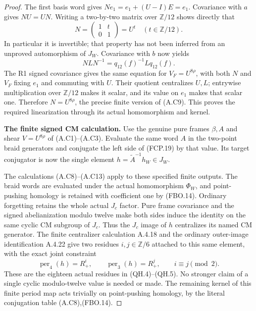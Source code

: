 \begin{proof}
The first basis word gives
$Ne_1=e_1+(U-I)E=e_1$.
Covariance with $a$ gives $NU=UN$.
Writing a two-by-two matrix over $\mathbb Z/12$ shows
directly that
\[
             N=\begin{pmatrix}1&t\\0&1\end{pmatrix}=U^t
                         \quad(t\in\mathbb Z/12).
                                                               \tag{FCP.L5}
\]
In particular it is invertible; that property has not
been inferred from an unproved automorphism of $J_W$.
Covariance with $b$ now yields
\[
        NLN^{-1}=q_{12}(f)^{-1}Lq_{12}(f).
                                                               \tag{FCP.L6}
\]
The R1 signed covariance gives the same equation for
$V_F=U^{8\rho}$, with both $N$ and $V_F$ fixing $e_1$
and commuting with $U$.
Their quotient centralizes $U,L$; entrywise multiplication
over $\mathbb Z/12$ makes it scalar, and its value on
$e_1$ makes that scalar one.
Therefore $N=U^{8\rho}$, the precise finite version
of (A.C9).  This proves the required linearization
through its actual homomorphism and kernel.

\par\medskip\noindent\textbf{The finite signed CM calculation.}\quad
Use the genuine pure frames $\beta,A$ and shear
$V=U^{8\rho}$ of (A.C1)--(A.C3).
Evaluate the same word $A$ in the two-point braid
generators and conjugate the left side of (FCP.19)
by that value.  Its target conjugator is now the
single element $h=\widetilde A^{-1}h_W\in J_W$.

The calculations (A.C8)--(A.C13) apply to these specified
finite outputs.  The braid words are evaluated under the
actual homomorphism $\Phi_W$, and point-pushing homology
is retained with coefficient one by (FBO.14).
Ordinary forgetting retains the whole actual $J_c$
factor.  Pure frame covariance and the signed
abelianization modulo twelve make both sides induce
the identity on the same cyclic CM subgroup of $J_c$.
Thus the $J_c$ image of $h$ centralizes its named CM
generator.  The finite centralizer calculation A.4.18
and the ordinary outer-image identification A.4.22
give two residues $i,j\in\mathbb Z/6$ attached to this same
element, with the exact joint constraint
\[
 \operatorname{per}_4(h)=R_+^i,\qquad
 \operatorname{per}_3(h)=R_+^j,\qquad i\equiv j\pmod2.
                                                               \tag{FCP.20}
\]
These are the eighteen actual residues in (QH.4)--(QH.5).
No stronger claim of a single cyclic modulo-twelve value
is needed or made.
The remaining kernel of this finite period map acts
trivially on point-pushing homology, by the literal
conjugation table (A.C8),(FBO.14).


\end{proof}
